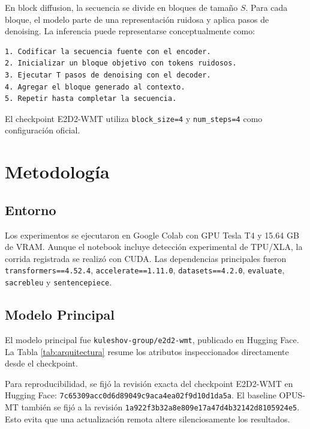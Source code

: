 \documentclass[conference]{IEEEtran}
\begin{document}
En block diffusion, la secuencia se divide en bloques de tamaño $S$. Para cada bloque, el modelo parte de una representación ruidosa y aplica pasos de denoising. La inferencia puede representarse conceptualmente como:

\begin{verbatim}
1. Codificar la secuencia fuente con el encoder.
2. Inicializar un bloque objetivo con tokens ruidosos.
3. Ejecutar T pasos de denoising con el decoder.
4. Agregar el bloque generado al contexto.
5. Repetir hasta completar la secuencia.
\end{verbatim}

El checkpoint E2D2-WMT utiliza \texttt{block\_size=4} y \texttt{num\_steps=4} como configuración oficial.

\section{Metodología}

\subsection{Entorno}

Los experimentos se ejecutaron en Google Colab con GPU Tesla T4 y 15.64 GB de VRAM. Aunque el notebook incluye detección experimental de TPU/XLA, la corrida registrada se realizó con CUDA. Las dependencias principales fueron \texttt{transformers==4.52.4}, \texttt{accelerate==1.11.0}, \texttt{datasets==4.2.0}, \texttt{evaluate}, \texttt{sacrebleu} y \texttt{sentencepiece}.

\subsection{Modelo Principal}

El modelo principal fue \texttt{kuleshov-group/e2d2-wmt}, publicado en Hugging Face. La Tabla \ref{tab:arquitectura} resume los atributos inspeccionados directamente desde el checkpoint.

Para reproducibilidad, se fijó la revisión exacta del checkpoint E2D2-WMT en Hugging Face: \texttt{7c65309acc0d6d89049c9aca4ea02f9d10d1da5a}. El baseline OPUS-MT también se fijó a la revisión \texttt{1a922f3b32a8e809e17a47d4b32142d8105924e5}. Esto evita que una actualización remota altere silenciosamente los resultados.
\end{document}
